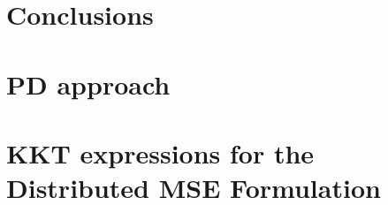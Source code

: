 \documentclass[11pt,draftcls,onecolumn,letterpaper]{./../Styles/IEEEtran}
\begin{document}
\acresetall
\section{Conclusions} \label{sec-6}


\appendices

\section{\acl{PD} approach} \label{a-2}


\section{\ac{KKT} expressions for the Distributed MSE Formulation} \label{a-1}




\end{document}

